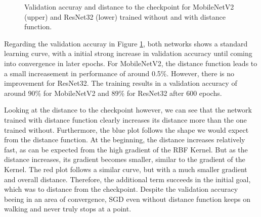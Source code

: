 \begin{figure}[H]
\begin{center}
        \caption{Validation accuray and distance to the checkpoint for MobileNetV2 (upper) and ResNet32 (lower) trained without  and with distance function.}
        \label{fig:Results_baseline}
    \end{center}
\end{figure}


Regarding the validation accuray in Figure \ref{fig:Results_baseline}, both
networks shows a standard learning curve, with a initial strong increase in
validation accuracy until coming into convergence in later epochs. For
MobileNetV2, the distance function leads to a small increasement in performance
of around 0.5\%. However, there is no improvement for ResNet32. The training
results in a validation accuracy of around 90\% for MobileNetV2 and 89\% for
ResNet32 after 600 epochs.

Looking at the distance to the checkpoint however, we can see that the network
trained with distance function clearly increases its distance more than the one
trained without. Furthermore, the blue plot follows the shape we would expect
from the distance function. At the beginning, the distance increases relatively
fast, as can be expected from the high gradient of the RBF Kernel. But as the
distance increases, its gradient becomes smaller, similar to the gradient of the
Kernel. The red plot follows a similar curve, but with a much smaller gradient
and overall distance. Therefore, the additional term succeeds in the initial
goal, which was to distance from the checkpoint. Despite the validation accuracy
beeing in an area of convergence, SGD even without distance function keeps on
walking and never truly stops at a point.





